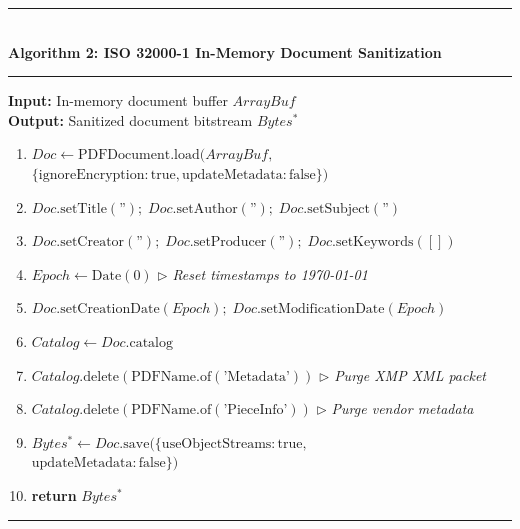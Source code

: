 \documentclass[journal]{IEEEtran}
\begin{document}
\begin{table}[!t]
\noindent\begin{minipage}{\columnwidth}
\rule{\columnwidth}{0.4pt} \\[2pt]
\textbf{\small Algorithm 2: ISO 32000-1 In-Memory Document Sanitization} \\
\rule{\columnwidth}{0.4pt}
\begin{footnotesize}
\raggedright
\noindent\textbf{Input:} In-memory document buffer $ArrayBuf$ \\
\noindent\textbf{Output:} Sanitized document bitstream $Bytes^*$
\begin{enumerate}[leftmargin=14pt, topsep=2pt, itemsep=1pt]
\item $Doc \leftarrow \text{PDFDocument.load}(ArrayBuf,$ \\
      \quad\quad $\{\text{ignoreEncryption}: \text{true}, \text{updateMetadata}: \text{false}\})$
\item $Doc.\text{setTitle}(\text{''}); \; Doc.\text{setAuthor}(\text{''}); \; Doc.\text{setSubject}(\text{''})$
\item $Doc.\text{setCreator}(\text{''}); \; Doc.\text{setProducer}(\text{''}); \; Doc.\text{setKeywords}([])$
\item $Epoch \leftarrow \text{Date}(0)$ $\triangleright$ \textit{Reset timestamps to 1970-01-01}
\item $Doc.\text{setCreationDate}(Epoch); \; Doc.\text{setModificationDate}(Epoch)$
\item $Catalog \leftarrow Doc.\text{catalog}$
\item $Catalog.\text{delete}(\text{PDFName.of}(\text{'Metadata'}))$ $\triangleright$ \textit{Purge XMP XML packet}
\item $Catalog.\text{delete}(\text{PDFName.of}(\text{'PieceInfo'}))$ $\triangleright$ \textit{Purge vendor metadata}
\item $Bytes^* \leftarrow Doc.\text{save}(\{\text{useObjectStreams}: \text{true},$ \\
      \quad\quad $\text{updateMetadata}: \text{false}\})$
\item \textbf{return} $Bytes^*$
\end{enumerate}
\end{footnotesize}
\vspace{-4pt}
\rule{\columnwidth}{0.4pt}
\end{minipage}
\vspace{-10pt}
\end{table}
\end{document}

